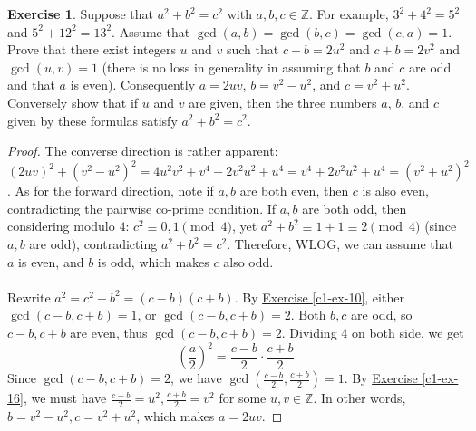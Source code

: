 \documentclass{article}
\theoremstyle{definition}
\newtheorem{exercise}{Exercise}
\begin{document}
\begin{exercise}
Suppose that $a^2 + b^2 = c^2$ with $a, b, c \in \mathbb{Z}$. For example, $3^2 + 4^2 = 5^2$ and $5^2 + 12^2 = 13^2$. Assume that $\gcd(a, b) = \gcd(b, c) = \gcd(c, a) = 1$. Prove that there exist integers $u$ and $v$ such that $c - b = 2u^2$ and $c + b = 2v^2$ and $\gcd(u, v) = 1$ (there is no loss in
generality in assuming that $b$ and $c$ are odd and that $a$ is even). Consequently $a = 2uv$, $b = v^2 - u^2$, and $c = v^2 + u^2$. Conversely show that if $u$ and $v$ are given, then the three numbers $a$, $b$, and $c$ given by these formulas satisfy $a^2 + b^2 = c^2$.
\end{exercise}
\begin{proof}
The converse direction is rather apparent: $(2uv)^2 + (v^2 - u^2)^2 = 4u^2 v^2 + v^4 - 2 v^2 u^2 + u^4 = v^4 + 2 v^2 u^2 + u^4 = (v^2 + u^2)^2$. As for the forward direction, note if $a, b$ are both even, then $c$ is also even, contradicting the pairwise co-prime condition. If $a, b$ are both odd, then considering modulo $4$: $c^2 \equiv 0, 1 \pmod{4}$, yet $a^2 + b^2 \equiv 1 + 1 \equiv 2 \pmod{4}$ (since $a, b$ are odd), contradicting $a^2 + b^2 = c^2$. Therefore, WLOG, we can assume that $a$ is even, and $b$ is odd, which makes $c$ also odd.
\\
\\
Rewrite $a^2 = c^2 - b^2 = (c - b)(c + b)$. By \hyperref[c1-ex-10]{Exercise \ref*{c1-ex-10}}, either $\gcd(c - b, c + b) = 1$, or $\gcd(c - b, c + b) = 2$. Both $b, c$ are odd, so $c - b, c + b$ are even, thus $\gcd(c - b, c + b) = 2$. Dividing $4$ on both side, we get
$$\left( \frac{a}{2} \right)^2 = \frac{c - b}{2} \cdot \frac{c + b}{2}$$
Since $\gcd(c - b, c + b) = 2$, we have $\gcd \left( \frac{c - b}{2}, \frac{c + b}{2} \right) = 1$. By \hyperref[c1-ex-16]{Exercise \ref*{c1-ex-16}}, we must have $\frac{c - b}{2} = u^2, \frac{c + b}{2} = v^2$ for some $u, v \in \mathbb{Z}$. In other words, $b = v^2 - u^2, c = v^2 + u^2$, which makes $a = 2uv$.
\end{proof}

\newpage
\end{document}

